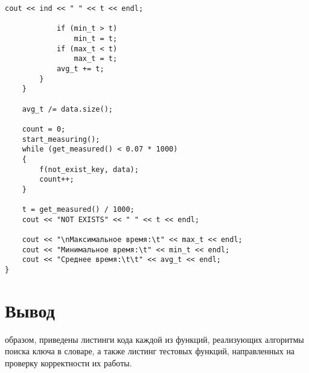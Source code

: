 \begin{lstlisting}[label=code_time, caption = Замеры процессорного времени]
			cout << ind << " " << t << endl;
			
			if (min_t > t)
				min_t = t;
			if (max_t < t)
				max_t = t;
			avg_t += t;
		}
	}
	
	avg_t /= data.size();
	
	count = 0;
	start_measuring();
	while (get_measured() < 0.07 * 1000)
	{
		f(not_exist_key, data);
		count++;
	}
	
	t = get_measured() / 1000;
	cout << "NOT EXISTS" << " " << t << endl;
	
	cout << "\nМаксимальное время:\t" << max_t << endl;
	cout << "Минимальное время:\t" << min_t << endl;
	cout << "Среднее время:\t\t" << avg_t << endl;
}
\end{lstlisting}

\section*{Вывод}
 образом, приведены листинги кода каждой из функций, реализующих алгоритмы поиска ключа в словаре, а также листинг тестовых функций, направленных на проверку корректности их работы.